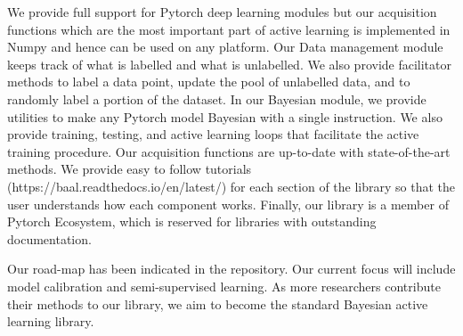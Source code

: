 \documentclass{article}
\begin{document}
We provide full support for Pytorch \cite{paszke2017automatic} deep learning modules but our acquisition functions which are the most important part of active learning is implemented in  Numpy\cite{oliphant2006guide} and hence can be used on any platform. Our Data management module keeps track of what is labelled and what is unlabelled. We also provide facilitator methods to label a data point, update the pool of unlabelled data, and to randomly label a portion of the dataset. In our Bayesian module, we provide utilities to make any Pytorch model Bayesian with a single instruction. We also provide training, testing, and active learning loops that facilitate the active training procedure. Our acquisition functions are up-to-date with state-of-the-art methods. We provide easy to follow tutorials (https://baal.readthedocs.io/en/latest/) for each section of the library so that the user understands how each component works. Finally, our library is a member of Pytorch Ecosystem, which is reserved for libraries with outstanding documentation.

Our road-map has been indicated in the repository. Our current focus will include model calibration and semi-supervised learning. As more researchers contribute their methods to our library, we aim to become the standard Bayesian active learning library.
\end{document}
